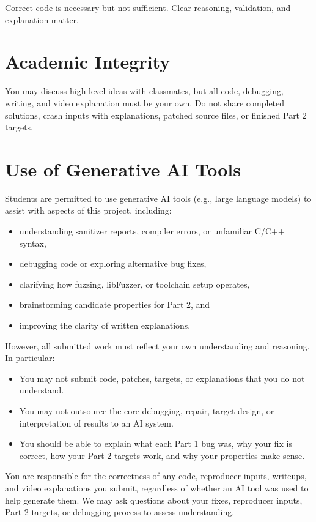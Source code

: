 \documentclass[11pt]{article}
\begin{document}
Correct code is necessary but not sufficient. Clear reasoning, validation, and explanation matter.

\section*{Academic Integrity}
You may discuss high-level ideas with classmates, but all code, debugging, writing, and video explanation must be your own. Do not share completed solutions, crash inputs with explanations, patched source files, or finished Part 2 targets.

\section*{Use of Generative AI Tools}
Students are permitted to use generative AI tools (e.g., large language models) to assist with aspects of this project, including:
\begin{itemize}
    \item understanding sanitizer reports, compiler errors, or unfamiliar C/C++ syntax,
    \item debugging code or exploring alternative bug fixes,
    \item clarifying how fuzzing, libFuzzer, or toolchain setup operates,
    \item brainstorming candidate properties for Part 2, and
    \item improving the clarity of written explanations.
\end{itemize}

However, all submitted work must reflect your own understanding and reasoning. In particular:
\begin{itemize}
    \item You may not submit code, patches, targets, or explanations that you do not understand.
    \item You may not outsource the core debugging, repair, target design, or interpretation of results to an AI system.
    \item You should be able to explain what each Part 1 bug was, why your fix is correct, how your Part 2 targets work, and why your properties make sense.
\end{itemize}

You are responsible for the correctness of any code, reproducer inputs, writeups, and video explanations you submit, regardless of whether an AI tool was used to help generate them. We may ask questions about your fixes, reproducer inputs, Part 2 targets, or debugging process to assess understanding.
\end{document}
